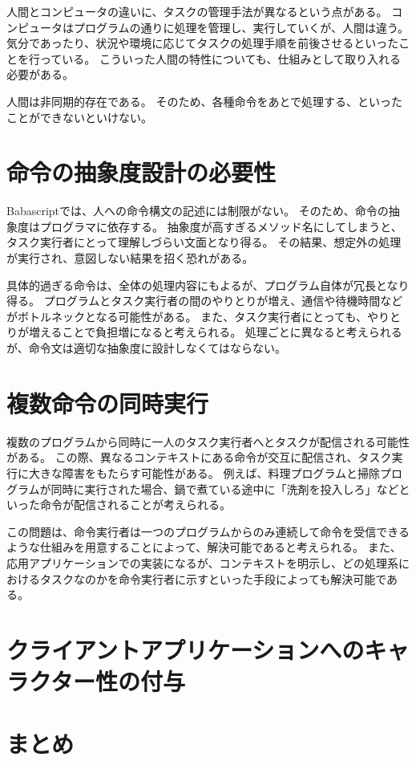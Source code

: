人間とコンピュータの違いに、タスクの管理手法が異なるという点がある。
コンピュータはプログラムの通りに処理を管理し、実行していくが、人間は違う。
気分であったり、状況や環境に応じてタスクの処理手順を前後させるといったことを行っている。
こういった人間の特性についても、仕組みとして取り入れる必要がある。

人間は非同期的存在である。
そのため、各種命令をあとで処理する、といったことができないといけない。

\section{命令の抽象度設計の必要性}\label{ux547dux4ee4ux306eux62bdux8c61ux5ea6ux8a2dux8a08ux306eux5fc5ux8981ux6027}

Babascriptでは、人への命令構文の記述には制限がない。
そのため、命令の抽象度はプログラマに依存する。
抽象度が高すぎるメソッド名にしてしまうと、タスク実行者にとって理解しづらい文面となり得る。
その結果、想定外の処理が実行され、意図しない結果を招く恐れがある。

具体的過ぎる命令は、全体の処理内容にもよるが、プログラム自体が冗長となり得る。
プログラムとタスク実行者の間のやりとりが増え、通信や待機時間などがボトルネックとなる可能性がある。
また、タスク実行者にとっても、やりとりが増えることで負担増になると考えられる。
処理ごとに異なると考えられるが、命令文は適切な抽象度に設計しなくてはならない。

\section{複数命令の同時実行}\label{ux8907ux6570ux547dux4ee4ux306eux540cux6642ux5b9fux884c}

複数のプログラムから同時に一人のタスク実行者へとタスクが配信される可能性がある。
この際、異なるコンテキストにある命令が交互に配信され、タスク実行に大きな障害をもたらす可能性がある。
例えば、料理プログラムと掃除プログラムが同時に実行された場合、鍋で煮ている途中に「洗剤を投入しろ」などといった命令が配信されることが考えられる。

この問題は、命令実行者は一つのプログラムからのみ連続して命令を受信できるような仕組みを用意することによって、解決可能であると考えられる。
また、応用アプリケーションでの実装になるが、コンテキストを明示し、どの処理系におけるタスクなのかを命令実行者に示すといった手段によっても解決可能である。

\section{クライアントアプリケーションへのキャラクター性の付与}\label{ux30afux30e9ux30a4ux30a2ux30f3ux30c8ux30a2ux30d7ux30eaux30b1ux30fcux30b7ux30e7ux30f3ux3078ux306eux30adux30e3ux30e9ux30afux30bfux30fcux6027ux306eux4ed8ux4e0e}

\section{まとめ}\label{ux307eux3068ux3081}
